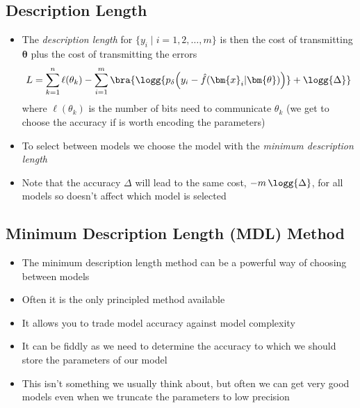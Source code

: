 \begin{slide}
\section{Description Length}

\begin{PauseHighLight}
  \begin{itemize}
  \item The \emph{description length} for $\{y_i \mid i=1,2,\ldots,m\}$ is
    then the cost of transmitting $\bm{\theta}$ plus the cost of
    transmitting the errors
    \begin{align*}
      L = \sum_{k=1}^n \ell(\theta_k) - \sum_{i=1}^m \bra{\logg{\strut p_\delta\!\left(y_i -
      \hat{f}(\bm{x}_i|\bm{\theta})\right)} + \logg{\Delta}}
    \end{align*}
    where $\ell(\theta_k) $ is the number of bits need to communicate
    $\theta_k$ (we get to choose the accuracy if is worth encoding the
    parameters)\pause
  \item To select between models we choose the model with the
    \emph{minimum description length}\pause
  \item Note that the accuracy $\Delta$ will lead to the same cost,
    $-m\,\logg{\Delta}$, for all models so doesn't affect which model is selected\pause
  \end{itemize}
\end{PauseHighLight}

\end{slide}


\begin{slide}
\section[-1]{Minimum Description Length (MDL) Method}

\begin{PauseHighLight}
  \begin{itemize}
  \item The minimum description length method can be a powerful way of
    choosing between models\pause
  \item Often it is the only principled method available\pause
  \item It allows you to trade model accuracy against model
    complexity\pause
  \item It can be fiddly as we need to determine the accuracy to which
    we should store the parameters of our model\pause
  \item This isn't something we usually think about, but often we can
    get very good models  even when we truncate the parameters to low
    precision\pause
  \end{itemize}
\end{PauseHighLight}

\end{slide}



